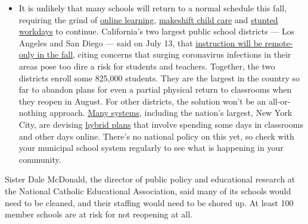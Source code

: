 \begin{itemize}
  \begin{itemize}
  \tightlist
  \item
    It is unlikely that many schools will return to a normal schedule
    this fall, requiring the grind of
    \href{https://www.nytimes.com/2020/06/05/us/coronavirus-education-lost-learning.html?action=click\&pgtype=Article\&state=default\&region=MAIN_CONTENT_3\&context=storylines_faq}{online
    learning},
    \href{https://www.nytimes.com/2020/05/29/us/coronavirus-child-care-centers.html?action=click\&pgtype=Article\&state=default\&region=MAIN_CONTENT_3\&context=storylines_faq}{makeshift
    child care} and
    \href{https://www.nytimes.com/2020/06/03/business/economy/coronavirus-working-women.html?action=click\&pgtype=Article\&state=default\&region=MAIN_CONTENT_3\&context=storylines_faq}{stunted
    workdays} to continue. California's two largest public school
    districts --- Los Angeles and San Diego --- said on July 13, that
    \href{https://www.nytimes.com/2020/07/13/us/lausd-san-diego-school-reopening.html?action=click\&pgtype=Article\&state=default\&region=MAIN_CONTENT_3\&context=storylines_faq}{instruction
    will be remote-only in the fall}, citing concerns that surging
    coronavirus infections in their areas pose too dire a risk for
    students and teachers. Together, the two districts enroll some
    825,000 students. They are the largest in the country so far to
    abandon plans for even a partial physical return to classrooms when
    they reopen in August. For other districts, the solution won't be an
    all-or-nothing approach.
    \href{https://bioethics.jhu.edu/research-and-outreach/projects/eschool-initiative/school-policy-tracker/}{Many
    systems}, including the nation's largest, New York City, are
    devising
    \href{https://www.nytimes.com/2020/06/26/us/coronavirus-schools-reopen-fall.html?action=click\&pgtype=Article\&state=default\&region=MAIN_CONTENT_3\&context=storylines_faq}{hybrid
    plans} that involve spending some days in classrooms and other days
    online. There's no national policy on this yet, so check with your
    municipal school system regularly to see what is happening in your
    community.
  \end{itemize}
\end{itemize}

Sister Dale McDonald, the director of public policy and educational
research at the National Catholic Educational Association, said many of
its schools would need to be cleaned, and their staffing would need to
be shored up. At least 100 member schools are at risk for not reopening
at all.

